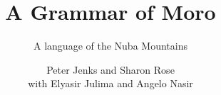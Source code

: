 \title{A Grammar of Moro}  %
\subtitle{A language of the Nuba Mountains}
\author{Peter Jenks and Sharon Rose\\ with Elyasir Julima and Angelo Nasir}
\renewcommand{\lsISBNdigital}{000-0-000000-00-0}
\renewcommand{\lsISBNhardcover}{000-0-000000-00-0}
\renewcommand{\lsISBNsoftcover}{000-0-000000-00-0}
\renewcommand{\lsSeries}{algad} %
